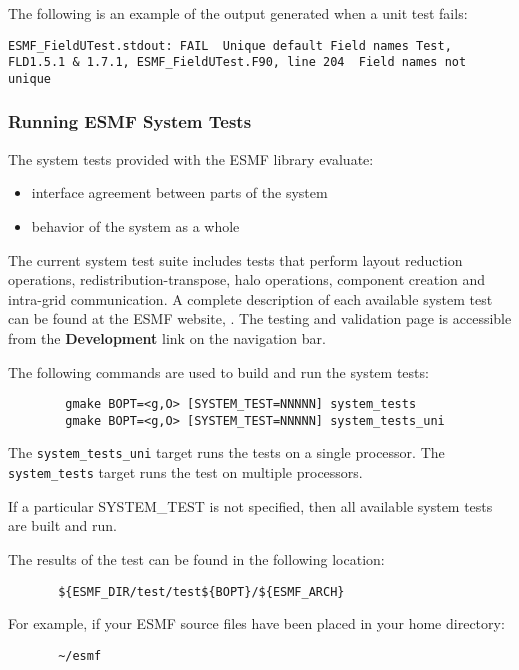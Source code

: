 The following is an example of the output generated when a unit test fails:
\begin{verbatim}
ESMF_FieldUTest.stdout: FAIL  Unique default Field names Test, FLD1.5.1 & 1.7.1, ESMF_FieldUTest.F90, line 204  Field names not unique
\end{verbatim}

\subsubsection{Running ESMF System Tests}
\label{SystemTestDescription}

The system tests provided with the ESMF library evaluate:
\begin{itemize}
\item interface agreement between parts of the system
\item behavior of the system as a whole
\end{itemize}

The current system test suite includes tests that perform layout reduction operations, 
redistribution-transpose, halo operations, component creation and intra-grid communication. 
A complete description of each available system test can be found at the ESMF website,
.  The testing
and validation page is accessible from the {\bf Development} link on the navigation bar.

The following commands are used to build and run the system tests:

\begin{verbatim}
        gmake BOPT=<g,O> [SYSTEM_TEST=NNNNN] system_tests
        gmake BOPT=<g,O> [SYSTEM_TEST=NNNNN] system_tests_uni
\end{verbatim}

The {\tt system\_tests\_uni} target runs the tests on a single processor. 
The {\tt system\_tests} target runs the test on multiple processors.

If a particular SYSTEM\_TEST is not specified, then all available system tests 
are built and run.

The results of the test can be found in the following location:
\begin{verbatim}
       ${ESMF_DIR/test/test${BOPT}/${ESMF_ARCH}
\end{verbatim}

For example, if your ESMF source files have been placed in your home directory:
\begin{verbatim}
       ~/esmf
\end{verbatim}

